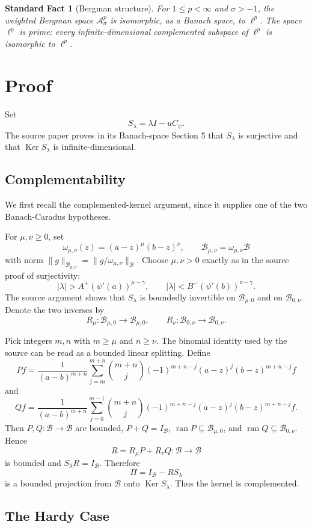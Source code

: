 \documentclass[11pt]{article}
\newtheorem{fact}{Standard Fact}
\newcommand{\B}{\mathcal B}
\newcommand{\A}{\mathcal A}
\newcommand{\ran}{\operatorname{ran}}
\newcommand{\Ker}{\operatorname{Ker}}
\begin{document}
\begin{fact}[Bergman structure]
For \(1\le p<\infty\) and \(\sigma>-1\), the weighted Bergman space
\(\A_\sigma^p\) is isomorphic, as a Banach space, to \(\ell^p\).  The space
\(\ell^p\) is prime: every infinite-dimensional complemented subspace of
\(\ell^p\) is isomorphic to \(\ell^p\).
\end{fact}

\section*{Proof}

Set
\[
  S_\lambda=\lambda I-uC_\psi .
\]
The source paper proves in its Banach-space Section 5 that \(S_\lambda\) is
surjective and that \(\Ker S_\lambda\) is infinite-dimensional.

\subsection*{Complementability}

We first recall the complemented-kernel argument, since it supplies one of the
two Banach-Caradus hypotheses.

For \(\mu,\nu\ge0\), set
\[
  \omega_{\mu,\nu}(z)=(a-z)^\mu(b-z)^\nu,\qquad
  \B_{\mu,\nu}=\omega_{\mu,\nu}\B
\]
with norm \(\|g\|_{\B_{\mu,\nu}}=\|g/\omega_{\mu,\nu}\|_{\B}\).  Choose
\(\mu,\nu>0\) exactly as in the source proof of surjectivity:
\[
  |\lambda|>A^+(\psi'(a))^{\mu-\gamma},
  \qquad
  |\lambda|<B^-(\psi'(b))^{\nu-\gamma}.
\]
The source argument shows that \(S_\lambda\) is boundedly invertible on
\(\B_{\mu,0}\) and on \(\B_{0,\nu}\).  Denote the two inverses by
\[
  R_\mu:\B_{\mu,0}\to\B_{\mu,0},\qquad
  R_\nu:\B_{0,\nu}\to\B_{0,\nu}.
\]

Pick integers \(m,n\) with \(m\ge\mu\) and \(n\ge\nu\).  The binomial identity
used by the source can be read as a bounded linear splitting.  Define
\[
  Pf=\frac{1}{(a-b)^{m+n}}
 \sum_{j=m}^{m+n} \binom{m+n}{j}(-1)^{m+n-j}
 (a-z)^j(b-z)^{m+n-j}f
\]
and
\[
  Qf=\frac{1}{(a-b)^{m+n}}
 \sum_{j=0}^{m-1} \binom{m+n}{j}(-1)^{m+n-j}
 (a-z)^j(b-z)^{m+n-j}f .
\]
Then \(P,Q:\B\to\B\) are bounded, \(P+Q=I_\B\),
\(\ran P\subseteq\B_{\mu,0}\), and \(\ran Q\subseteq\B_{0,\nu}\).  Hence
\[
  R=R_\mu P+R_\nu Q:\B\to\B
\]
is bounded and \(S_\lambda R=I_\B\).  Therefore
\[
  \Pi=I_\B-RS_\lambda
\]
is a bounded projection from \(\B\) onto \(\Ker S_\lambda\).  Thus the kernel
is complemented.

\subsection*{The Hardy Case}
\end{document}
